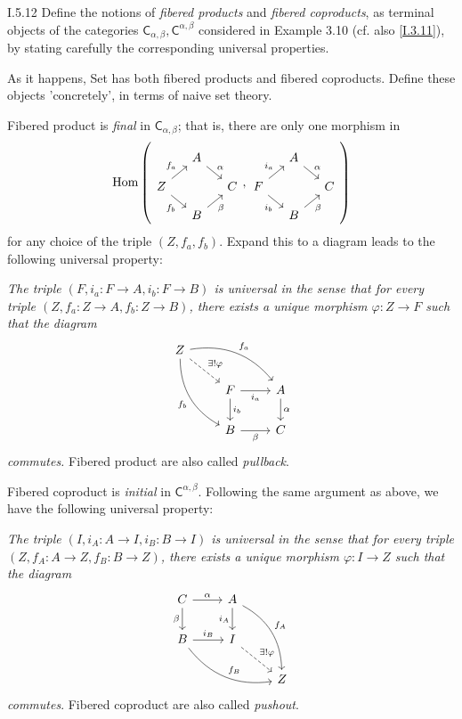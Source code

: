 \begin{problem}{I.5.12}
Define the notions of \emph{fibered products} and \emph{fibered coproducts}, as terminal objects of the categories $\mathsf{C}_{\alpha, \beta}, \mathsf{C}^{\alpha, \beta}$ considered in Example 3.10 (cf. also \ref{I.3.11}), by stating carefully the corresponding universal properties. 

As it happens, \textsf{Set} has both fibered products and fibered coproducts. Define these objects 'concretely', in terms of naive set theory.
\end{problem}
\begin{solution}
Fibered product is \emph{final} in $\mathsf{C}_{\alpha, \beta}$; that is, there are only one morphism in 
\[
\Hom\left(
\begin{tikzcd}[column sep=small, row sep=small]
& A \arrow[rd, "\alpha"] &   \\
Z \arrow[ru, "f_a"] \arrow[rd, "f_b"'] &  & C \\
& B \arrow[ru, "\beta"'] &  
\end{tikzcd},
\begin{tikzcd}[column sep=small, row sep=small]
& A \arrow[rd, "\alpha"] &   \\
F \arrow[ru, "i_a"] \arrow[rd, "i_b"'] &  & C \\
& B \arrow[ru, "\beta"'] &  
\end{tikzcd}
\right)    
\]
for any choice of the triple $(Z,f_a,f_b)$. Expand this to a diagram leads to the following universal property:

\textit{
The triple $(F, i_a:F \to A, i_b:F \to B)$ is universal in the sense that for every triple $(Z,f_a:Z \to A,f_b:Z \to B)$, there exists a unique morphism $\varphi: Z \to F$ such that the diagram}
\[
\begin{tikzcd}
Z \arrow[rd, "\exists!\varphi", dashed] \arrow[rdd, "f_b"', bend right] \arrow[rrd, "f_a", bend left] & & \\
& F \arrow[d, "i_b"] \arrow[r, "i_a"'] & A \arrow[d, "\alpha"] \\
& B \arrow[r, "\beta"']  & C                    
\end{tikzcd}    
\]
\textit{commutes.} Fibered product are also called \emph{pullback}.

Fibered coproduct is \emph{initial} in $\mathsf{C}^{\alpha, \beta}$. Following the same argument as above, we have the following universal property:

\textit{
The triple $(I, i_A:A \to I, i_B:B \to I)$ is universal in the sense that for every triple $(Z,f_A:A \to Z,f_B:B \to Z)$, there exists a unique morphism $\varphi: I \to Z$ such that the diagram}
\[
\begin{tikzcd}
C \arrow[r, "\alpha"] \arrow[d, "\beta"']         & A \arrow[d, "i_A"'] \arrow[rdd, "f_A", bend left] &   \\
B \arrow[r, "i_B"] \arrow[rrd, "f_B", bend right] & I \arrow[rd, "\exists!\varphi", dashed]   &   \\
& & Z
\end{tikzcd}    
\]
\textit{commutes}. Fibered coproduct are also called \emph{pushout}.


\end{solution}
